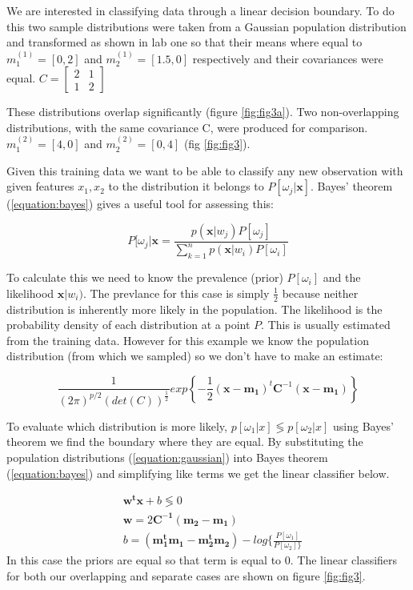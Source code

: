 \documentclass[a4paper,11pt, twocolumn]{article}
\begin{document}
We are interested in classifying data through a linear decision boundary. To do this two sample distributions were taken from a Gaussian population distribution and transformed as shown in lab one so that their means where equal to $m_1^{(1)}=[0, 2]$ and $m_2^{(1)}=[1.5, 0]$ respectively and their covariances were equal. 
$C = \begin{bmatrix}
2 & 1 \\
1 & 2
\end{bmatrix} $

These distributions overlap significantly (figure \ref{fig:fig3a}). Two non-overlapping distributions, with the same covariance C, were produced for comparison. $m_1^{(2)} = [4,0]$ and $m_2^{(2)} = [0,4]$ (fig \ref{fig:fig3}). 

Given this training data we want to be able to classify any new observation with given features $x_1, x_2$ to the distribution it belongs to $P[\omega_j|\mathbf{x}]$. Bayes' theorem (\ref{equation:bayes}) gives a useful tool for assessing this:

\begin{equation}
P[\omega_j|\mathbf{x} = \frac{p(\mathbf{x}|w_j) P[\omega_j]}{\sum_{k=1}^n p(\mathbf{x}|w_i) P[\omega_i]}
\label{equation:bayes}
\end{equation}

To calculate this we need to know the prevalence (prior) $P[\omega_i]$ and the likelihood $\mathbf{x}|w_i)$. The prevlance for this case is simply $\frac{1}{2}$ because neither distribution is inherently more likely in the population. The likelihood is the probability density of each distribution at a point $P$. This is usually estimated from the training data. However for this example we know the population distribution (from which we sampled) so we don't have to make an estimate:

\begin{equation}
\label{equation:gaussian}
\scriptstyle
\frac{1}{(2\pi)^{p/2}(det(C))^{\frac{1}{2}}}exp\left\lbrace-\frac{1}{2}(\mathbf{x-m_1})^t\mathbf{C}^{-1}(\mathbf{x-m_1})\right\rbrace
\end{equation}

To evaluate which distribution is more likely, $p[\omega_1|x] \lessgtr p[\omega_2|x]$ using Bayes' theorem we find the boundary where they are equal. By substituting the population distributions (\ref{equation:gaussian}) into Bayes theorem (\ref{equation:bayes}) and simplifying like terms we get the linear classifier below.

\begin{align}
&\mathbf{w^tx} + b \lessgtr 0 \nonumber \\
&\mathbf{w} = 2\mathbf{C^{-1}(m_2 - m_1)}  \\
&b = \mathbf{(m_1^tm_1 - m_2^tm_2)} - log\{\frac{P[\omega_1]}{P[\omega_2]\}} \nonumber
\end{align}
In this case the priors are equal so that term is equal to 0. The linear classifiers for both our overlapping and separate cases are shown on figure \ref{fig:fig3}.
\end{document}
